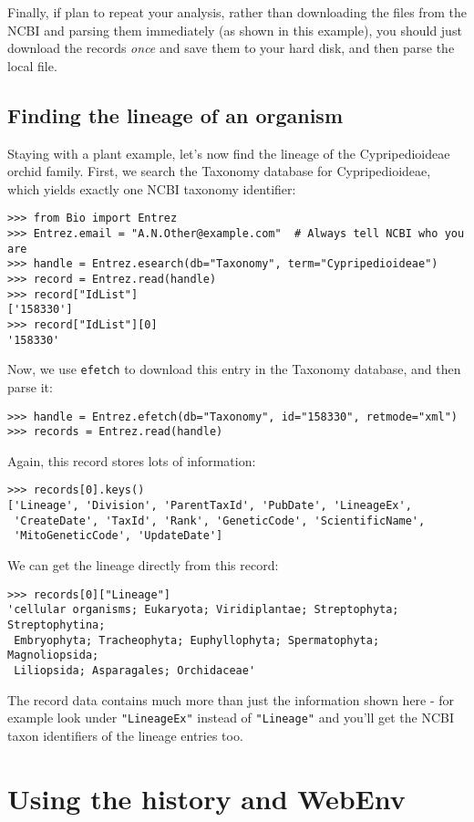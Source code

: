 Finally, if plan to repeat your analysis, rather than downloading the files from the NCBI and parsing them immediately (as shown in this example), you should just download the records \emph{once} and save them to your hard disk, and then parse the local file.

\subsection{Finding the lineage of an organism}

Staying with a plant example, let's now find the lineage of the Cypripedioideae orchid family. First, we search the Taxonomy database for Cypripedioideae, which yields exactly one NCBI taxonomy identifier:

\begin{verbatim}
>>> from Bio import Entrez
>>> Entrez.email = "A.N.Other@example.com"  # Always tell NCBI who you are
>>> handle = Entrez.esearch(db="Taxonomy", term="Cypripedioideae")
>>> record = Entrez.read(handle)
>>> record["IdList"]
['158330']
>>> record["IdList"][0]
'158330'
\end{verbatim}
Now, we use \verb+efetch+ to download this entry in the Taxonomy database, and then parse it:

\begin{verbatim}
>>> handle = Entrez.efetch(db="Taxonomy", id="158330", retmode="xml")
>>> records = Entrez.read(handle)
\end{verbatim}
Again, this record stores lots of information:
\begin{verbatim}
>>> records[0].keys()
['Lineage', 'Division', 'ParentTaxId', 'PubDate', 'LineageEx',
 'CreateDate', 'TaxId', 'Rank', 'GeneticCode', 'ScientificName',
 'MitoGeneticCode', 'UpdateDate']
\end{verbatim}
We can get the lineage directly from this record:
\begin{verbatim}
>>> records[0]["Lineage"]
'cellular organisms; Eukaryota; Viridiplantae; Streptophyta; Streptophytina;
 Embryophyta; Tracheophyta; Euphyllophyta; Spermatophyta; Magnoliopsida;
 Liliopsida; Asparagales; Orchidaceae'
\end{verbatim}

The record data contains much more than just the information shown here - for example look under \texttt{"LineageEx"} instead of \texttt{"Lineage"} and you'll get the NCBI taxon identifiers of the lineage entries too.

\section{Using the history and WebEnv}
\label{sec:entrez-webenv}

